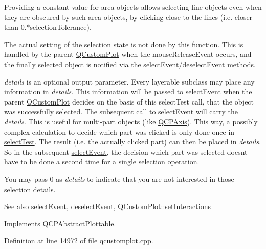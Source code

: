 Providing a constant value for area objects allows selecting line objects even when they are obscured by such area objects, by clicking close to the lines (i.\+e. closer than 0.$\ast$selection\+Tolerance).

The actual setting of the selection state is not done by this function. This is handled by the parent \hyperlink{class_q_custom_plot}{Q\+Custom\+Plot} when the mouse\+Release\+Event occurs, and the finally selected object is notified via the select\+Event/deselect\+Event methods.

{\itshape details} is an optional output parameter. Every layerable subclass may place any information in {\itshape details}. This information will be passed to \hyperlink{class_q_c_p_abstract_plottable_a16aaad02456aa23a759efd1ac90c79bf}{select\+Event} when the parent \hyperlink{class_q_custom_plot}{Q\+Custom\+Plot} decides on the basis of this select\+Test call, that the object was successfully selected. The subsequent call to \hyperlink{class_q_c_p_abstract_plottable_a16aaad02456aa23a759efd1ac90c79bf}{select\+Event} will carry the {\itshape details}. This is useful for multi-\/part objects (like \hyperlink{class_q_c_p_axis}{Q\+C\+P\+Axis}). This way, a possibly complex calculation to decide which part was clicked is only done once in \hyperlink{class_q_c_p_graph_abc9ff375aabcf2d21cca33d6baf85772}{select\+Test}. The result (i.\+e. the actually clicked part) can then be placed in {\itshape details}. So in the subsequent \hyperlink{class_q_c_p_abstract_plottable_a16aaad02456aa23a759efd1ac90c79bf}{select\+Event}, the decision which part was selected doesn\textquotesingle{}t have to be done a second time for a single selection operation.

You may pass 0 as {\itshape details} to indicate that you are not interested in those selection details.

\begin{DoxySeeAlso}{See also}
\hyperlink{class_q_c_p_abstract_plottable_a16aaad02456aa23a759efd1ac90c79bf}{select\+Event}, \hyperlink{class_q_c_p_abstract_plottable_a6fa0d0f95560ea8b01ee13f296dab2b1}{deselect\+Event}, \hyperlink{class_q_custom_plot_a5ee1e2f6ae27419deca53e75907c27e5}{Q\+Custom\+Plot\+::set\+Interactions} 
\end{DoxySeeAlso}


Implements \hyperlink{class_q_c_p_abstract_plottable_a38efe9641d972992a3d44204bc80ec1d}{Q\+C\+P\+Abstract\+Plottable}.



Definition at line 14972 of file qcustomplot.\+cpp.



